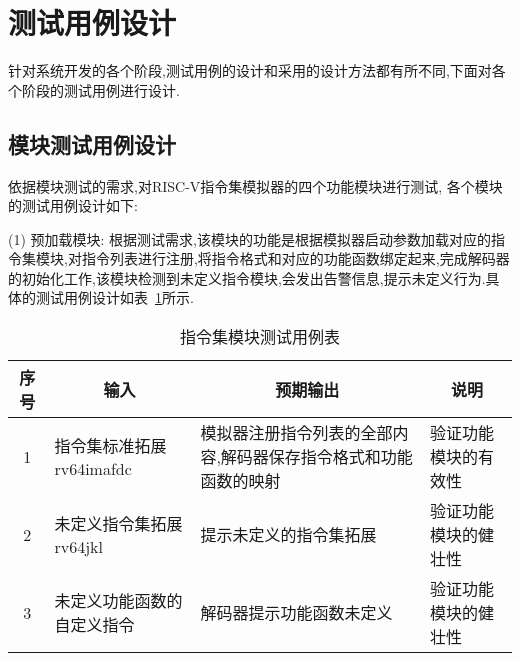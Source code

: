 \section{测试用例设计}
针对系统开发的各个阶段,测试用例的设计和采用的设计方法都有所不同,下面对各个阶段的测试用例进行设计.

\subsection{模块测试用例设计}
依据模块测试的需求,对RISC-V指令集模拟器的四个功能模块进行测试, 各个模块的测试用例设计如下:


(1) 预加载模块: 根据测试需求,该模块的功能是根据模拟器启动参数加载对应的指令集模块,对指令列表进行注册,将指令格式和对应的功能函数绑定起来,完成解码器的初始化工作,该模块检测到未定义指令模块,会发出告警信息,提示未定义行为.具体的测试用例设计如表~\ref{tab:test1}所示.
\begin{table}[h]
    \centering
    \caption{指令集模块测试用例表}
    \label{tab:test1}
    \begin{tabular}{clll}
      \toprule
      \multicolumn{1}{c}{序号} & \multicolumn{1}{c}{输入} & \multicolumn{1}{c}{预期输出} &\multicolumn{1}{c}{说明}\\
      \midrule
  1	& \multicolumn{1}{m{3.5cm}}{指令集标准拓展rv64imafdc} & \multicolumn{1}{m{3.5cm}}{模拟器注册指令列表的全部内容,解码器保存指令格式和功能函数的映射} & \multicolumn{1}{m{3.5cm}}{验证功能模块的有效性}\\
  \hline
  2	& \multicolumn{1}{m{3.5cm}}{未定义指令集拓展rv64jkl} & \multicolumn{1}{m{3.5cm}}{提示未定义的指令集拓展} & \multicolumn{1}{m{3.5cm}}{验证功能模块的健壮性}\\
  \hline
  3	& \multicolumn{1}{m{3.5cm}}{未定义功能函数的自定义指令} & \multicolumn{1}{m{3.5cm}}{解码器提示功能函数未定义} & \multicolumn{1}{m{3.5cm}}{验证功能模块的健壮性}\\
      \bottomrule
    \end{tabular}
\end{table}


